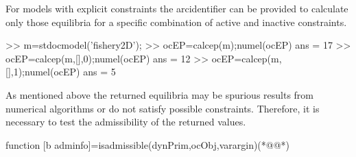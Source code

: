 For models with explicit constraints the arcidentifier can be provided to calculate only those equilibria for a specific combination of active and inactive constraints.
\begin{matlab}
>> m=stdocmodel('fishery2D');
>> ocEP=calcep(m);numel(ocEP)
ans =
    17
>> ocEP=calcep(m,[],0);numel(ocEP)
ans =
    12
>> ocEP=calcep(m,[],1);numel(ocEP)
ans =
     5
\end{matlab}
As mentioned above the returned equilibria may be spurious results from numerical algorithms or do not satisfy possible constraints. Therefore, it is necessary to test the admissibility of the returned values.
\begin{matlab}
function [b adminfo]=isadmissible(dynPrim,ocObj,varargin)(*@@*)
%
%
%
%
%
%
\end{matlab}
